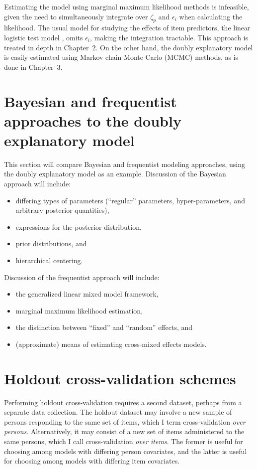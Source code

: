 Estimating the model using marginal maximum likelihood methods is infeasible, given the need to simultaneously integrate over $\zeta_p$ and $\epsilon_i$ when calculating the likelihood. The usual model for studying the effects of item predictors, the linear logistic test model \parencite{Fischer1973}, omits $\epsilon_i$, making the integration tractable. This approach is treated in depth in Chapter~2. On the other hand, the doubly explanatory model is easily estimated using Markov chain Monte Carlo (MCMC) methods, as is done in Chapter~3.


\section{Bayesian and frequentist approaches to the doubly explanatory model}

This section will compare Bayesian and frequentist modeling approaches, using the doubly explanatory model as an example. Discussion of the Bayesian approach will include:
\begin{itemize}
	\item differing types of parameters (``regular'' parameters, hyper-parameters, and arbitrary posterior quantities), 
	\item expressions for the posterior distribution, 
	\item prior distributions, and 
	\item hierarchical centering. 
\end{itemize}
Discussion of the frequentist approach will include:
\begin{itemize}
	\item the generalized linear mixed model framework,
	\item marginal maximum likelihood estimation,
	\item the distinction between ``fixed'' and ``random'' effects, and
	\item (approximate) means of estimating cross-mixed effects models.
\end{itemize}


\section{Holdout cross-validation schemes}

Performing holdout cross-validation requires a second dataset, perhaps from a separate data collection. The holdout dataset may involve a new sample of persons responding to the same set of items, which I term cross-validation \emph{over persons}. Alternatively, it may consist of a new set of items administered to the same persons, which I call cross-validation \emph{over items}. The former is useful for choosing among models with differing person covariates, and the latter is useful for choosing among models with differing item covariates.

